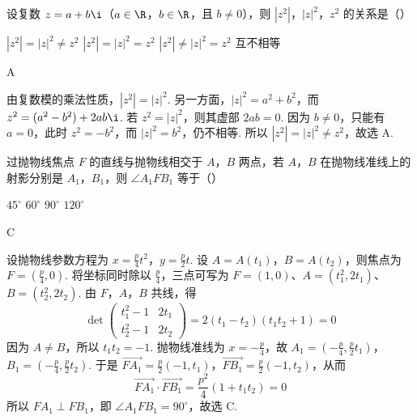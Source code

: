 \documentclass[UTF8,a4paper,oneside,11pt]{ctexbook}
\begin{document}
\begin{problem}

设复数 \(z = a + b\i\)（\(a\in\R\)，\(b\in\R\)，且 \(b \neq 0\)），则 \(|z^2|\)，\(|z|^2\)，\(z^2\) 的关系是（\quad）

\choices
    {\(|z^{2}|=|z|^{2}\neq z^{2} \)}
    {\(|z^{2}|=|z|^{2}=z^{2} \)}
    {\(|z^{2}| \neq |z|^{2} = z^{2} \)}
    {互不相等}
\end{problem}

\begin{answer}
A
\end{answer}

\begin{solution}
由复数模的乘法性质，\(|z^2|=|z|^2\). 另一方面，\(|z|^2=a^2+b^2\)，而 \(z^2=(a^2-b^2)+2ab\i\). 若 \(z^2=|z|^2\)，则其虚部 \(2ab=0\). 因为 \(b\neq0\)，只能有 \(a=0\)，此时 \(z^2=-b^2\)，而 \(|z|^2=b^2\)，仍不相等. 所以 \(|z^2|=|z|^2\neq z^2\)，故选 A.
\end{solution}

\begin{problem}

过抛物线焦点 \(F\) 的直线与抛物线相交于 \(A\)，\(B\) 两点，若 \(A\)，\(B\) 在抛物线准线上的射影分别是 \(A_{1}\)，\(B_{1}\)，则 \(\angle A_{1}FB_{1}\) 等于（\quad）

\choices
    {\(45^{\circ}\)}
    {\(60^{\circ}\)}
    {\(90^{\circ}\)}
    {\(120^{\circ}\)}
\end{problem}

\begin{answer}
C
\end{answer}

\begin{solution}
设抛物线参数方程为 \(x=\frac{p}{4}t^2\)，\(y=\frac{p}{2}t\). 设 \(A=A(t_1)\)，\(B=A(t_2)\)，则焦点为 \(F=(\frac p4,0)\). 将坐标同时除以 \(\frac p4\)，三点可写为 \(F=(1,0)\)、\(A=(t_1^2,2t_1)\)、\(B=(t_2^2,2t_2)\). 由 \(F\)，\(A\)，\(B\) 共线，得
\[
\det\begin{pmatrix}t_1^2-1&2t_1\\t_2^2-1&2t_2\end{pmatrix}=2(t_1-t_2)(t_1t_2+1)=0
\]
因为 \(A\neq B\)，所以 \(t_1t_2=-1\). 抛物线准线为 \(x=-\frac p4\)，故 \(A_1=(-\frac p4,\frac p2t_1)\)，\(B_1=(-\frac p4,\frac p2t_2)\). 于是 \(\overrightarrow{FA_1}=\frac p2(-1,t_1)\)，\(\overrightarrow{FB_1}=\frac p2(-1,t_2)\)，从而
\[
\overrightarrow{FA_1}\cdot\overrightarrow{FB_1}=\frac{p^2}{4}(1+t_1t_2)=0
\]
所以 \(FA_1\perp FB_1\)，即 \(\angle A_1FB_1=90^\circ\)，故选 C.
\end{solution}
\end{document}
